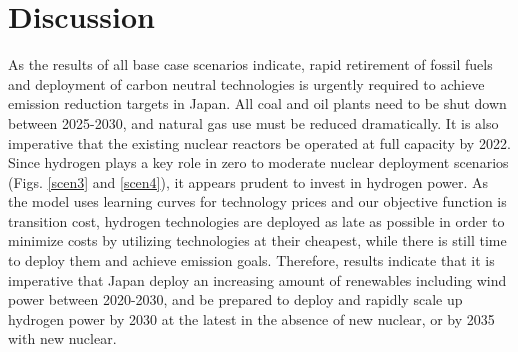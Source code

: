 \section{Discussion}


As the results of all base case scenarios indicate, rapid retirement of fossil fuels and deployment of carbon neutral technologies is urgently required to achieve emission reduction targets in Japan. All coal and oil plants need to be shut down between 2025-2030, and natural gas use must be reduced dramatically. It is also imperative that the existing nuclear reactors be operated at full capacity by 2022. Since hydrogen plays a key role in zero to moderate nuclear deployment scenarios (Figs. \ref{scen3} and \ref{scen4}), it appears prudent to invest in hydrogen power. As the model uses learning curves for technology prices and our objective function is transition cost, hydrogen technologies are deployed as late as possible in order to minimize costs by utilizing technologies at their cheapest, while there is still time to deploy them and achieve emission goals. Therefore,  results indicate that it is imperative that Japan deploy an increasing amount of renewables including wind power between 2020-2030, and be prepared to deploy and rapidly scale up hydrogen power by 2030 at the latest in the absence of new nuclear, or by 2035 with new nuclear.

